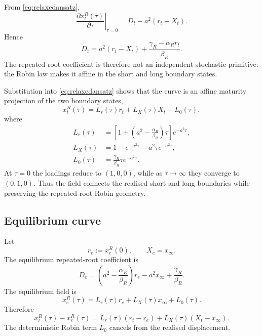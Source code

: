 \documentclass[11pt]{article}
\numberwithin{equation}{section}
\begin{document}
From \eqref{eq:relaxedansatz},
\begin{equation}
 \left.\frac{\partial x_t^R(\tau)}{\partial\tau}\right|_{\tau=0}
 =D_t-a^2(r_t-X_t).
\end{equation}
Hence
\begin{equation}
 {
 D_t
 =a^2(r_t-X_t)+\frac{\gamma_R-\alpha_Rr_t}{\beta_R}.
 }
 \label{eq:Dtgeneral}
\end{equation}
The repeated-root coefficient is therefore not an independent stochastic primitive: the Robin law makes it affine in the short and long boundary states.

Substitution into \eqref{eq:relaxedansatz} shows that the curve is an affine maturity projection of the two boundary states,
\begin{equation}
 x_t^R(\tau)=L_r(\tau)r_t+L_X(\tau)X_t+L_0(\tau),
 \label{eq:loadingrepresentation}
\end{equation}
where
\begin{align}
 L_r(\tau)
 &=\left[1+\left(a^2-\frac{\alpha_R}{\beta_R}\right)\tau\right]e^{-a^2\tau},
 \label{eq:Lr}\\
 L_X(\tau)
 &=1-e^{-a^2\tau}-a^2\tau e^{-a^2\tau},
 \label{eq:LX}\\
 L_0(\tau)
 &=\frac{\gamma_R}{\beta_R}\tau e^{-a^2\tau}.
 \label{eq:L0}
\end{align}
At $\tau=0$ the loadings reduce to $(1,0,0)$, while as $\tau\to\infty$ they converge to $(0,1,0)$. Thus the field connects the realised short and long boundaries while preserving the repeated-root Robin geometry.

\subsection{Equilibrium curve}

Let
\begin{equation}
 r_e:=x_e^R(0),
 \qquad X_e=x_\infty.
\end{equation}
The equilibrium repeated-root coefficient is
\begin{equation}
 {
 D_e
 =\left(a^2-\frac{\alpha_R}{\beta_R}\right)r_e
 -a^2x_\infty
 +\frac{\gamma_R}{\beta_R}.
 }
 \label{eq:De}
\end{equation}
The equilibrium field is
\begin{equation}
 x_e^R(\tau)=L_r(\tau)r_e+L_X(\tau)x_\infty+L_0(\tau).
 \label{eq:eqcurve}
\end{equation}
Therefore
\begin{equation}
 {
 x_t^R(\tau)-x_e^R(\tau)
 =L_r(\tau)(r_t-r_e)+L_X(\tau)(X_t-x_\infty).
 }
 \label{eq:displacement}
\end{equation}
The deterministic Robin term $L_0$ cancels from the realised displacement.
\end{document}
